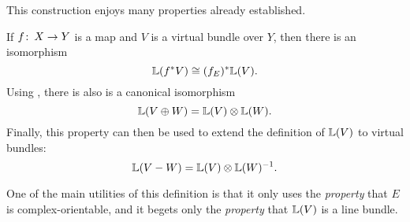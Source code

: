 This construction enjoys many properties already established.
\begin{corollary} 
If $f \colon\thinspace X \to Y$ is a map and $V$ is a virtual bundle over $Y$, then there is an isomorphism \[\mathbb{L}(f^* V) \cong (f_E)^* \mathbb{L}(V).\]  Using , there is also is a canonical isomorphism \[\mathbb{L}(V \oplus W) = \mathbb{L}(V) \otimes \mathbb{L}(W).\]  Finally, this property can then be used to extend the definition of $\mathbb{L}(V)$ to virtual bundles: \[\ThomSheaf{V - W} = \ThomSheaf{V} \otimes \ThomSheaf{W}^{-1}. \qed\]
\end{corollary}

\begin{remark}
One of the main utilities of this definition is that it only uses the \emph{property} that $E$ is complex-orientable, and it begets only the \emph{property} that $\mathbb{L}(V)$ is a line bundle.
\end{remark}

